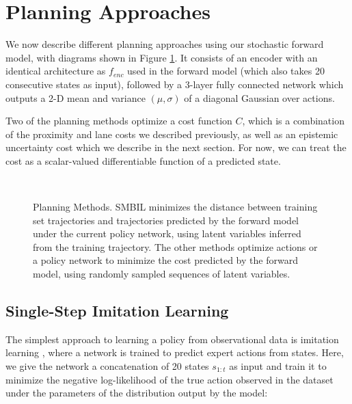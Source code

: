 \documentclass{article} %
\begin{document}
\section{Planning Approaches}
  \label{planning-methods}

  We now describe different planning approaches using our stochastic forward model, with diagrams shown in Figure \ref{planning-methods}.
  It consists of an encoder with an identical architecture as $f_{enc}$ used in the forward model (which also takes 20 consecutive states as input), followed by a 3-layer fully connected network which outputs a 2-D mean and variance $(\mu, \sigma)$ of a diagonal Gaussian over actions.

  Two of the planning methods optimize a cost function $C$, which is a combination of the proximity and lane costs we described previously, as well as an epistemic uncertainty cost which we describe in the next section. For now, we can treat the cost as a scalar-valued differentiable function of a predicted state.


\begin{figure}[ht!]
    \centering
     \\
    \label{planning-methods}
    \caption{Planning Methods. SMBIL minimizes the distance between training set trajectories and trajectories predicted by the forward model under the current policy network, using latent variables inferred from the training trajectory. The other methods optimize actions or a policy network to minimize the cost predicted by the forward model, using randomly sampled sequences of latent variables.}
\end{figure}



  \subsection{Single-Step Imitation Learning}


  The simplest approach to learning a policy from observational data is imitation learning \citep{Pomerleau91}, where a network is trained to predict expert actions from states. Here, we give the network a concatenation of 20 states $s_{1:t}$ as input and train it to minimize the negative log-likelihood of the true action observed in the dataset under the parameters of the distribution output by the model:
\end{document}
